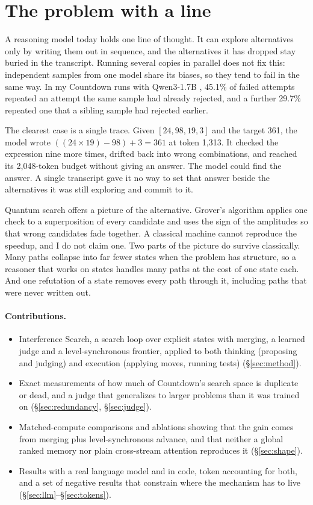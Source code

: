 \documentclass[10pt,twocolumn]{article}
\newcommand{\IS}{Interference Search}
\begin{document}
\section{The problem with a line}

A reasoning model today holds one line of thought. It can explore alternatives only by writing them out in sequence, and the alternatives it has dropped stay buried in the transcript. Running several copies in parallel does not fix this: independent samples from one model share its biases, so they tend to fail in the same way. In my Countdown runs with Qwen3-1.7B \citep{qwen3}, 45.1\% of failed attempts repeated an attempt the same sample had already rejected, and a further 29.7\% repeated one that a sibling sample had rejected earlier.

The clearest case is a single trace. Given $[24, 98, 19, 3]$ and the target 361, the model wrote $((24 \times 19) - 98) + 3 = 361$ at token 1,313. It checked the expression nine more times, drifted back into wrong combinations, and reached its 2,048-token budget without giving an answer. The model could find the answer. A single transcript gave it no way to set that answer beside the alternatives it was still exploring and commit to it.

Quantum search offers a picture of the alternative. Grover's algorithm \citep{grover1996} applies one check to a superposition of every candidate and uses the sign of the amplitudes so that wrong candidates fade together. A classical machine cannot reproduce the speedup, and I do not claim one. Two parts of the picture do survive classically. Many paths collapse into far fewer states when the problem has structure, so a reasoner that works on states handles many paths at the cost of one state each. And one refutation of a state removes every path through it, including paths that were never written out.

\paragraph{Contributions.}
\begin{itemize}
\item \IS{}, a search loop over explicit states with merging, a learned judge and a level-synchronous frontier, applied to both thinking (proposing and judging) and execution (applying moves, running tests) (\S\ref{sec:method}).
\item Exact measurements of how much of Countdown's search space is duplicate or dead, and a judge that generalizes to larger problems than it was trained on (\S\ref{sec:redundancy}, \S\ref{sec:judge}).
\item Matched-compute comparisons and ablations showing that the gain comes from merging plus level-synchronous advance, and that neither a global ranked memory nor plain cross-stream attention reproduces it (\S\ref{sec:shape}).
\item Results with a real language model and in code, token accounting for both, and a set of negative results that constrain where the mechanism has to live (\S\ref{sec:llm}--\S\ref{sec:tokens}).
\end{itemize}
\end{document}
